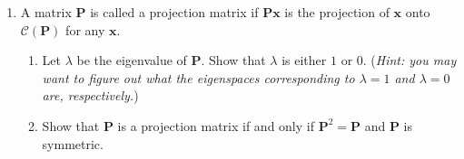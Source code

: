 \documentclass[11pt,letter,notitlepage]{article}
\begin{document}
\begin{exercise}
\begin{enumerate}
        \item A matrix $\mathbf{P}$ is called a projection matrix if $\mathbf{P}\mathbf{x}$ is the projection of $\mathbf{x}$ onto $\mathcal{C}(\mathbf{P})$ for any $\mathbf{x}$.
              \begin{enumerate}
                  \item Let $\lambda$ be the eigenvalue of $\mathbf{P}$. Show that $\lambda$ is either $1$ or $0$. (\emph{Hint: you may want to figure out what the eigenspaces corresponding to $\lambda=1$ and $\lambda=0$ are, respectively.})
                  \item Show that $\mathbf{P}$ is a projection matrix if and only if $\mathbf{P}^2 = \mathbf{P}$ and $\mathbf{P}$ is symmetric.
              \end{enumerate}


    \end{enumerate}
\end{exercise}
\end{document}
